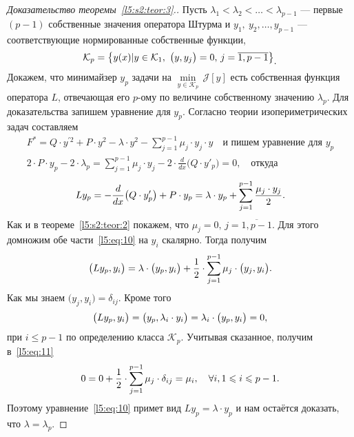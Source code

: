 \documentclass[12pt,a4paper,openany,fleqn]{book}
\newcommand{\J}{\ensuremath{\mathcal{J}}}
\newcommand{\mc}[1]{\ensuremath{\mathcal{#1}}}
\newcommand{\der}[2]{\ensuremath{\frac{d#1}{d#2}}}
\newcommand{\K}{\mc{K}}
\theoremstyle{definition}
\begin{document}
\begin{proof}[Доказательство теоремы~\ref{l5:s2:teor:3}.]
Пусть $\lambda_1<\lambda_2<\ldots<\lambda_{p-1}$ --- первые $(p-1)$ собственные значения оператора Штурма и $y_1,\ y_2,\ldots,y_{p-1}$ --- соответствующие нормированные собственные функции,
\begin{equation*}
	\hfill\K_{p}=\left\{y(x)|y\in\K_1,\  \big(y,y_j\big)=0,\,j=\overline{1,p-1}\right\}_{\displaystyle.}\hfill
\end{equation*}
Докажем, что минимайзер $y_p$ задачи на $\min\limits_{y\in\K_p}\,\J[y]$ есть собственная функция оператора $L$, отвечающая его $p$-ому по величине собственному значению $\lambda_p$. Для доказательства запишем уравнение для $y_p$. Согласно теории изопериметрических задач составляем
\begin{gather*}
	F^{\ast}=Q\cdot y^{\prime2}+P\cdot y^2-\lambda\cdot y^2-\sum\limits_{j=1}^{p-1}\mu_j\cdot y_j\cdot y\quad\text{и пишем уравнение для }y_p\\
	2\cdot P\cdot y_p-2\cdot\lambda_p=\sum\limits_{j=1}^{p-1}\mu_j\cdot y_j-2\cdot\der{}{x}\big(Q\cdot y'_p\big)=0,\quad\text{откуда}
\end{gather*}  
\begin{equation}
	\label{l5:eq:10}
	\hfill Ly_p=-\der{}{x}\big(Q\cdot y'_p\big)+P\cdot y_p=\lambda\cdot y_p+\sum\limits_{j=1}^{p-1}\frac{\mu_j\cdot y_j}{2}.\hfill
\end{equation}
Как и в теореме~\ref{l5:s2:teor:2} покажем, что $\mu_j=0,\,j=\overline{1,p-1}$. Для этого домножим обе части~\eqref{l5:eq:10} на $y_i$ скалярно. Тогда получим
\begin{equation}
	\label{l5:eq:11}
	\hfill\big(Ly_p,y_i\big)=\lambda\cdot\big(y_p,y_i\big)+\frac12\cdot\sum\limits_{j=1}^{p-1}\mu_j\cdot\big(y_j,y_i\big).\hfill
\end{equation}
Как мы знаем $\big(y_j,y_i\big)=\delta_{ij}$. Кроме того 
\begin{equation*}
	\hfill\big(Ly_p,y_i\big)=\big(y_p,\lambda_i\cdot y_i\big)=\lambda_i\cdot\big(y_p,y_i\big)=0,\hfill
\end{equation*}
при $i\leqslant p-1$ по определению класса $\K_p$. Учитывая сказанное, получим в~\eqref{l5:eq:11}
\begin{equation*}
	\hfill0=0+\frac12\cdot\sum\limits_{j=1}^{p-1}\mu_j\cdot\delta_{ij}=\mu_i,\quad\forall i, 1\leqslant i\leqslant p-1.\hfill
\end{equation*}
Поэтому уравнение~\eqref{l5:eq:10} примет вид $Ly_p=\lambda\cdot y_p$ и нам остаётся доказать, что $\lambda=\lambda_p$. 


\end{proof}
\end{document}
